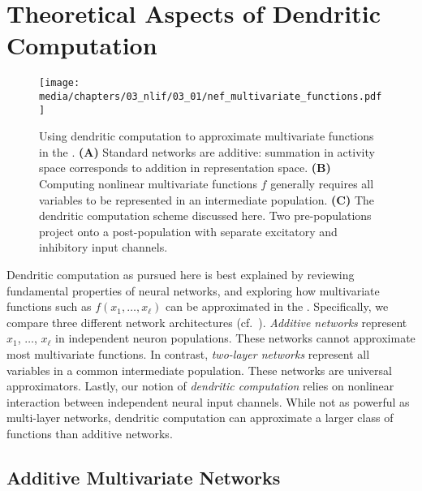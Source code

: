 
\section{Theoretical Aspects of Dendritic Computation}
\label{sec:dendritic_computation_theory}

\begin{figure}
	\centering
	\texttt{[image: media/chapters/03\_nlif/03\_01/nef\_multivariate\_functions.pdf]}%
	{\label{fig:nef_multivariate_functions_a}}%
	{\label{fig:nef_multivariate_functions_b}}%
	{\label{fig:nef_multivariate_functions_c}}%
	\caption[Using dendritic computation to approximate multivariate functions in the NEF]{Using dendritic computation to approximate multivariate functions in the \NEF. \textbf{(A)} Standard \NEF networks are additive: summation in activity space corresponds to addition in representation space.
	\textbf{(B)} Computing nonlinear multivariate functions $f$ generally requires all variables to be represented in an intermediate population.
	\textbf{(C)} The dendritic computation scheme discussed here.
	Two pre-populations project onto a post-population with separate excitatory and inhibitory input channels.
	}
	\label{fig:nef_multivariate_functions}
\end{figure}

Dendritic computation as pursued here is best explained by reviewing fundamental properties of neural networks, and exploring how mul\-ti\-va\-ri\-ate functions such as $f(x_1, \ldots, x_\ell)$ can be approximated in the \NEF.
Specifically, we compare three different network architectures (cf.~).
\emph{Additive networks} represent $x_1$, $\ldots$, $x_\ell$ in independent neuron populations.
These networks cannot approximate most multivariate functions.
In contrast, \emph{two-layer networks} represent all variables in a common intermediate population.
These networks are universal approximators.
Lastly, our notion of \emph{dendritic computation} relies on nonlinear interaction between independent neural input channels.
While not as powerful as multi-layer networks, dendritic computation can approximate a larger class of functions than additive networks.

\subsection{Additive Multivariate Networks}
\label{sec:additive_net}

